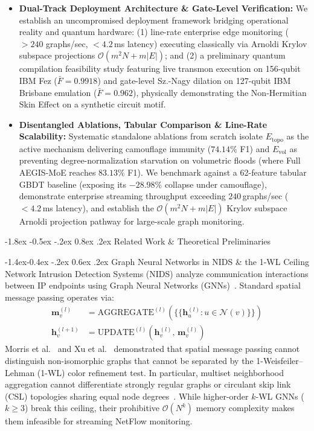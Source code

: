 \documentclass[10pt,twocolumn,letterpaper]{article}
\makeatletter
\renewcommand\section{\@startsection {section}{1}{\z@}%
                                   {-1.8ex \@plus -0.5ex \@minus -.2ex}%
                                   {0.8ex \@plus .2ex}%
                                   {\normalfont\large\bfseries}}
\renewcommand\subsection{\@startsection{subsection}{2}{\z@}%
                                     {-1.4ex\@plus -0.4ex \@minus -.2ex}%
                                     {0.6ex \@plus .2ex}%
                                     {\normalfont\normalsize\bfseries}}
\makeatother
\begin{document}
\begin{itemize}
    \item \textbf{Dual-Track Deployment Architecture \& Gate-Level Verification:} We establish an uncompromised deployment framework bridging operational reality and quantum hardware: (1) line-rate enterprise edge monitoring ($>240$ graphs/sec, $<4.2$\,ms latency) executing classically via Arnoldi Krylov subspace projections $\mathcal{O}(m^2 N + m |E|)$; and (2) a preliminary quantum compilation feasibility study featuring live transmon execution on 156-qubit IBM Fez ($\bar{F} = 0.9918$) and gate-level Sz.-Nagy dilation on 127-qubit IBM Brisbane emulation ($\bar{F} = 0.962$), physically demonstrating the Non-Hermitian Skin Effect on a synthetic circuit motif.
    \item \textbf{Disentangled Ablations, Tabular Comparison \& Line-Rate Scalability:} Systematic standalone ablations from scratch isolate $E_{\text{topo}}$ as the active mechanism delivering camouflage immunity ($74.14\%$ F1) and $E_{\text{vol}}$ as preventing degree-normalization starvation on volumetric floods (where Full AEGIS-MoE reaches $83.13\%$ F1). We benchmark against a 62-feature tabular GBDT baseline (exposing its $-28.98\%$ collapse under camouflage), demonstrate enterprise streaming throughput exceeding $240$\,graphs/sec ($<4.2$\,ms latency), and establish the $\mathcal{O}(m^2 N + m |E|)$ Krylov subspace Arnoldi projection pathway for large-scale graph monitoring.
\end{itemize}

\section{Related Work \& Theoretical Preliminaries}
\label{sec:related}

\subsection{Graph Neural Networks in NIDS \& the 1-WL Ceiling}
Network Intrusion Detection Systems (NIDS) analyze communication interactions between IP endpoints using Graph Neural Networks (GNNs)~\cite{zhou2022hierarchical, lo2022dlgnn, shen2021threatrace}. Standard spatial message passing operates via:
\begin{align}
\mathbf{m}_v^{(l)} &= \mathrm{AGGREGATE}^{(l)}\left(\{\!\{ \mathbf{h}_u^{(l)} : u \in \mathcal{N}(v) \}\!\}\right) \\
\mathbf{h}_v^{(l+1)} &= \mathrm{UPDATE}^{(l)}\left(\mathbf{h}_v^{(l)}, \, \mathbf{m}_v^{(l)}\right)
\end{align}
Morris et al.~\cite{morris2019weisfeiler} and Xu et al.~\cite{xu2019powerful} demonstrated that spatial message passing cannot distinguish non-isomorphic graphs that cannot be separated by the 1-Weisfeiler--Lehman (1-WL) color refinement test. In particular, multiset neighborhood aggregation cannot differentiate strongly regular graphs or circulant skip link (CSL) topologies sharing equal node degrees~\cite{dwivedi2023benchmarking}. While higher-order $k$-WL GNNs ($k \ge 3$) break this ceiling, their prohibitive $\mathcal{O}(N^k)$ memory complexity makes them infeasible for streaming NetFlow monitoring.
\end{document}
